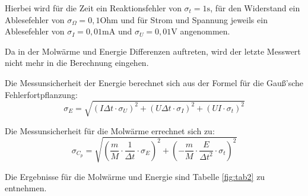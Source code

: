 \noindent Hierbei wird für die Zeit ein Reaktionsfehler von \(\sigma_t=1\text{s}\), für den Widerstand ein Ablesefehler von \(\sigma_\Omega=0,1\text{Ohm}\) und für Strom und Spannung jeweils ein Ablesefehler von \(\sigma_I=0,01\text{mA}\) und \(\sigma_U=0,01\text{V}\) angenommen.

\noindent Da in der Molwärme und Energie Differenzen auftreten, wird der letzte Messwert nicht mehr in die Berechnung eingehen.

\noindent Die Messunsicherheit der Energie berechnet sich aus der Formel für die Gauß'sche Fehlerfortpflanzung:
\begin{equation}
\sigma_E=\sqrt{(I\Delta t\cdot\sigma_U)^2 + (U\Delta t\cdot\sigma_I)^2 + (UI\cdot\sigma_t)^2}
\end{equation}

\noindent Die Messunsicherheit für die Molwärme errechnet sich zu:
\begin{equation}
\sigma_{C_p}=\sqrt{\left(\frac mM\cdot\frac{1}{\Delta t}\cdot\sigma_E\right)^2+\left(-\frac mM\cdot\frac{E}{\Delta t^2}\cdot\sigma_t\right)^2 }
\end{equation}

\noindent Die Ergebnisse für die Molwärme und Energie sind Tabelle \ref{fig:tab2} zu entnehmen.

